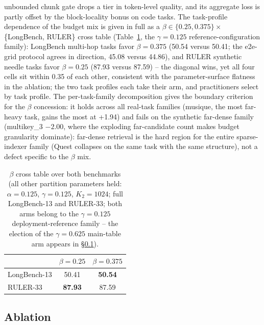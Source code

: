 \documentclass[11pt]{article}
\begin{document}
unbounded chunk gate drops a tier in token-level quality, and its aggregate loss is partly offset by the block-locality bonus on code tasks. The task-profile dependence of the budget mix is given in full as a $\beta \in \{0.25, 0.375\} \times$ \{LongBench, RULER\} cross table (Table~\ref{tab:betacross}, the $\gamma{=}0.125$ reference-configuration family): LongBench multi-hop tasks favor $\beta{=}0.375$ (50.54 versus 50.41; the e2e-grid protocol agrees in direction, 45.08 versus 44.86), and RULER synthetic needle tasks favor $\beta{=}0.25$ (87.93 versus 87.59) -- the diagonal wins, yet all four cells sit within 0.35 of each other, consistent with the parameter-surface flatness in the ablation; the two task profiles each take their arm, and practitioners select by task profile. The per-task-family decomposition gives the boundary criterion for the $\beta$ concession: it holds across all real-task families (musique, the most far-heavy task, gains the most at +1.94) and fails on the synthetic far-dense family (multikey\_3 $-2.00$, where the exploding far-candidate count makes budget granularity dominate): far-dense retrieval is the hard region for the entire sparse-indexer family (Quest collapses on the same task with the same structure), not a defect specific to the $\beta$ mix.

\begin{table}[h]\centering
\caption{$\beta$ cross table over both benchmarks (all other partition parameters held: $\alpha{=}0.125$, $\gamma{=}0.125$, $K_2{=}1024$; full LongBench-13 and RULER-33; both arms belong to the $\gamma{=}0.125$ deployment-reference family -- the election of the $\gamma{=}0.625$ main-table arm appears in \S\ref{sec:abl}).}
\label{tab:betacross}
\begin{tabular}{lcc}
\toprule
 & $\beta{=}0.25$ & $\beta{=}0.375$ \\
\midrule
LongBench-13 & 50.41 & \textbf{50.54} \\
RULER-33 & \textbf{87.93} & 87.59 \\
\bottomrule
\end{tabular}
\end{table}

\subsection{Ablation}\label{sec:abl}
\end{document}
